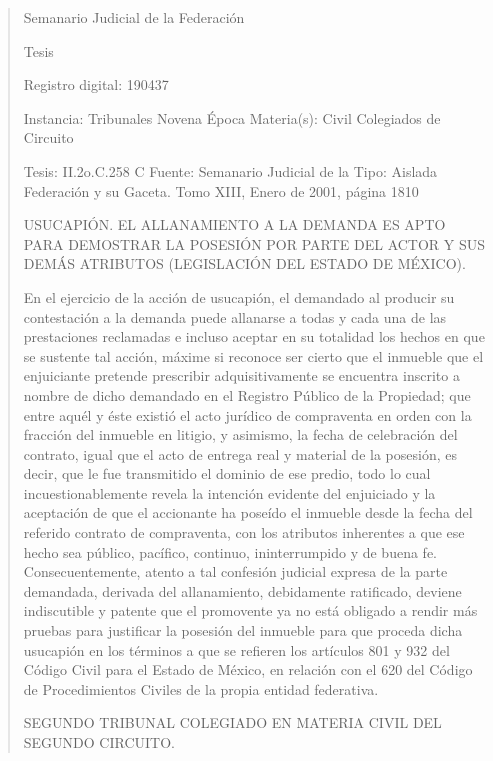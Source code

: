 \documentclass[11pt,a4paper]{article}
\begin{document}
\begin{quote}
                                                   Semanario Judicial de la Federación

                                                  Tesis

 Registro digital: 190437

 Instancia: Tribunales            Novena Época                          Materia(s): Civil
 Colegiados de Circuito

 Tesis: II.2o.C.258 C             Fuente: Semanario Judicial de la      Tipo: Aislada
                                  Federación y su Gaceta.
                                  Tomo XIII, Enero de 2001, página
                                  1810


USUCAPIÓN. EL ALLANAMIENTO A LA DEMANDA ES APTO PARA DEMOSTRAR LA
POSESIÓN POR PARTE DEL ACTOR Y SUS DEMÁS ATRIBUTOS (LEGISLACIÓN DEL ESTADO
DE MÉXICO).


En el ejercicio de la acción de usucapión, el demandado al producir su contestación a la demanda
puede allanarse a todas y cada una de las prestaciones reclamadas e incluso aceptar en su
totalidad los hechos en que se sustente tal acción, máxime si reconoce ser cierto que el inmueble
que el enjuiciante pretende prescribir adquisitivamente se encuentra inscrito a nombre de dicho
demandado en el Registro Público de la Propiedad; que entre aquél y éste existió el acto jurídico de
compraventa en orden con la fracción del inmueble en litigio, y asimismo, la fecha de celebración
del contrato, igual que el acto de entrega real y material de la posesión, es decir, que le fue
transmitido el dominio de ese predio, todo lo cual incuestionablemente revela la intención evidente
del enjuiciado y la aceptación de que el accionante ha poseído el inmueble desde la fecha del
referido contrato de compraventa, con los atributos inherentes a que ese hecho sea público,
pacífico, continuo, ininterrumpido y de buena fe. Consecuentemente, atento a tal confesión judicial
expresa de la parte demandada, derivada del allanamiento, debidamente ratificado, deviene
indiscutible y patente que el promovente ya no está obligado a rendir más pruebas para justificar la
posesión del inmueble para que proceda dicha usucapión en los términos a que se refieren los
artículos 801 y 932 del Código Civil para el Estado de México, en relación con el 620 del Código de
Procedimientos Civiles de la propia entidad federativa.

SEGUNDO TRIBUNAL COLEGIADO EN MATERIA CIVIL DEL SEGUNDO CIRCUITO.



\end{quote}
\end{document}
